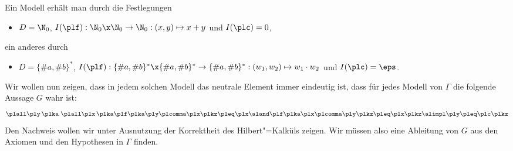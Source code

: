Ein Modell erhält man \zB durch die Festlegungen
\begin{itemize}
\item $D=\N_0$, $I(\plf):\N_0\x\N_0\to\N_0:(x,y)\mapsto x+y$ und $I(\plc)=0$,
\end{itemize}
ein anderes durch
\begin{itemize}
\item $D=\{\#a,\#b\}^*$,
  $I(\plf):\{\#a,\#b\}^*\x
  \{\#a,\#b\}^*\to\{\#a,\#b\}^*:(w_1,w_2)\mapsto w_1\cdot w_2$ und
  $I(\plc)=\eps$.
\end{itemize}
%
Wir wollen nun zeigen, dass in jedem solchen Modell das neutrale
Element immer eindeutig ist, \dh dass für jedes Modell von $\Gamma$
die folgende Aussage $G$ wahr ist:
\[
  \plall\ply \, \plka \; \plall\plx\,
  \plka\plf\plka\ply\plcomma\plx\plkz \pleq \plx \aland
  \plf\plka\plx\plcomma\ply\plkz \pleq\plx\plkz \alimpl \ply\pleq\plc
  \plkz
\]
%
Den Nachweis wollen wir unter Ausnutzung der Korrektheit des
Hilbert"=Kalküls zeigen.
%
Wir müssen also eine Ableitung von $G$ aus den Axiomen und den
Hypothesen in $\Gamma$ finden.

